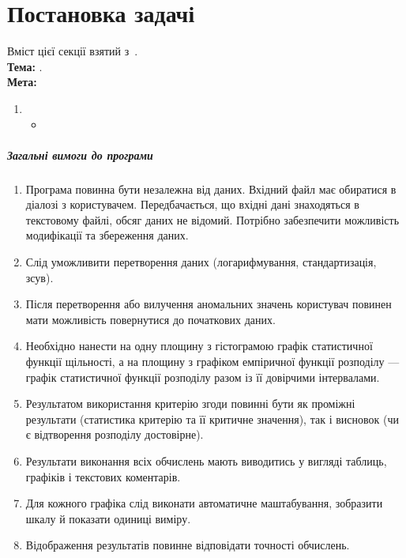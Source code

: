 \documentclass[../../document]{subfiles}
\begin{document}
\BeforeChpater{}

\chapter{Постановка задачі}
Вміст цієї секції взятий з~\cite{pristavka_matstat}.\\
\textbf{Тема:} \worktheme.\\
\textbf{Мета:} 
\begin{enumerate}
	\item
		\begin{itemize}
			\item 
		\end{itemize}
\end{enumerate}

\paragraph*{Загальні вимоги до програми}
\begin{enumerate}
	\item Програма повинна бути незалежна від даних. Вхідний файл має
		обиратися в діалозі з користувачем. Передбачається, що вхідні дані знаходяться
		в текстовому файлі, обсяг даних не відомий. Потрібно забезпечити можливість
		модифікації та збереження даних.
	\item Слід уможливити перетворення даних (логарифмування,
		стандартизація, зсув).
	\item Після перетворення або вилучення аномальних значень користувач
		повинен мати можливість повернутися до початкових даних.
	\item Необхідно нанести на одну площину з гістограмою графік статистичної
		функції щільності, а на площину з графіком емпіричної функції розподілу ---
		графік статистичної функції розподілу разом із її довірчими інтервалами.
	\item Результатом використання критерію згоди повинні бути як проміжні
		результати (статистика критерію та її критичне значення), так і висновок (чи є
		відтворення розподілу достовірне).
	\item Результати виконання всіх обчислень мають виводитись у вигляді
		таблиць, графіків і текстових коментарів.
	\item Для кожного графіка слід виконати автоматичне маштабування,
		зобразити шкалу й показати одиниці виміру.
	\item Відображення результатів повинне відповідати точності обчислень.
\end{enumerate}

\AfterChapter{}
\end{document}
